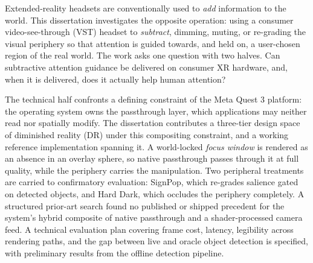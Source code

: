 \documentclass[a4paper, 12pt, oneside]{report}
\begin{document}
\thesistitlepage

\hypersetup{pageanchor=false}
\thesisdeclarationpage
\hypersetup{pageanchor=true}

\begin{thesisabstract}
Extended-reality headsets are conventionally used to \textit{add} information to the world. This
dissertation investigates the opposite operation: using a consumer video-see-through (VST) headset to
\textit{subtract}, dimming, muting, or re-grading the visual periphery so that attention is guided
towards, and held on, a user-chosen region of the real world. The work asks one question with two
halves. Can subtractive attention guidance be delivered on consumer XR hardware, and, when it is
delivered, does it actually help human attention?

The technical half confronts a defining constraint of the Meta Quest 3 platform: the operating system
owns the passthrough layer, which applications may neither read nor spatially modify. The
dissertation contributes a three-tier design space of diminished reality (DR) under this compositing
constraint, and a working reference implementation spanning it. A world-locked \textit{focus window}
is rendered as an absence in an overlay sphere, so native passthrough passes through it at full
quality, while the periphery carries the manipulation. Two peripheral treatments are carried to
confirmatory evaluation: SignPop, which re-grades salience gated on detected objects, and Hard Dark,
which occludes the periphery completely. A structured prior-art search found no published or shipped
precedent for the system's hybrid composite of native passthrough and a shader-processed camera feed.
A technical evaluation plan covering frame cost, latency, legibility across rendering paths, and the
gap between live and oracle object detection is specified, with preliminary results from the offline
detection pipeline.


\end{thesisabstract}
\end{document}

